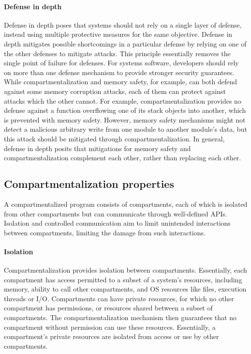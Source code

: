 \paragraph{Defense in depth}
Defense in depth poses that systems should not rely on a single layer of
defense, instead using multiple protective measures for the same objective.
Defense in depth mitigates possible shortcomings in a particular defense by
relying on one of the other defenses to mitigate attacks.
This principle essentially removes the single point of failure for defenses.
For systems software, developers should rely on more than one defense
mechanism to provide stronger security guarantees.
While compartmentalization and memory safety, for example, can both defend
against some memory corruption attacks, each of them can protect against
attacks which the other cannot.
For example, compartmentalization provides no defense against a function
overflowing one of its stack objects into another, which is prevented with
memory safety.
However, memory safety mechanisms might not detect a malicious arbitrary
write from one module to another module's data, but this attack should be
mitigated through compartmentalization.
In general, defense in depth posits that mitigations for memory safety and
compartmentalization complement each other, rather than replacing each other.

\subsection{Compartmentalization properties}
\label{sec:seccells:background:properties}
A compartmentalized program consists of compartments, each of which is
isolated from other compartments but can communicate through well-defined
APIs.
Isolation and controlled communication aim to limit unintended interactions
between compartments, limiting the damage from such interactions.

\paragraph{Isolation}
Compartmentalization provides isolation between compartments. 
Essentially, each compartment has access permitted to a subset of a system's
resources, including memory, ability to call other compartments, and 
OS resources like files, execution threads or I/O.
Compartments can have private resources, for which no other compartment has
permissions, or resources shared between a subset of compartments.
The compartmentalization mechanism then guarantees that no compartment
without permission can use these resources.
Essentially, a compartment's private resources are isolated from access or
use by other compartments.

